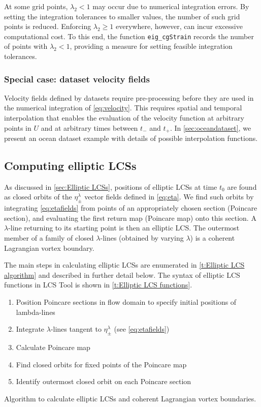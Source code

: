 \documentclass{elsarticle}
\begin{document}
At some grid points, $\lambda_2 < 1$ may occur due to numerical integration errors. By setting the integration tolerances to smaller values, the number of such grid points is reduced. Enforcing $\lambda_2 \geq 1$ everywhere, however, can incur excessive computational cost. To this end, the function \lstinline!eig_cgStrain! records the number of points with $\lambda_2 < 1$, providing a measure for setting feasible integration tolerances.

\subsubsection{Special case: dataset velocity fields}

Velocity fields defined by datasets require pre-processing before they are used in the numerical integration of \cref{eq:velocity}. This requires spatial and temporal interpolation that enables the evaluation of the velocity function at arbitrary points in $U$ and at arbitrary times between $t_-$ and $t_+$. In \cref{sec:oceandataset}, we present an ocean dataset example with details of possible interpolation functions.

\subsection{Computing elliptic LCSs}

As discussed in \cref{sec:Elliptic LCSs}, positions of elliptic LCSs at time $t_0$ are found as closed orbits of the $\eta_\pm^\lambda$ vector fields defined in \cref{eq:eta}. We find such orbits by integrating \cref{eq:etafields} from points of an appropriately chosen section (Poincare section), and evaluating the first return map (Poincare map) onto this section. A $\lambda$-line returning to its starting point is then an elliptic LCS. The outermost member of a family of closed $\lambda$-lines (obtained by varying $\lambda$) is a coherent Lagrangian vortex boundary\citep{haller13:_coher_lagran}.

The main steps in calculating elliptic LCSs are enumerated in \cref{t:Elliptic LCS algorithm} and described in further detail below. The syntax of elliptic LCS functions in LCS Tool is shown in \cref{t:Elliptic LCS functions}.

\begin{table}
\begin{center}
\begin{enumerate}
\item Position Poincare sections in flow domain to specify initial positions of lambda-lines
\item Integrate $\lambda$-lines tangent to $\eta_\pm^\lambda$ (see \cref{eq:etafields})
\item Calculate Poincare map
\item Find closed orbits for fixed points of the Poincare map
\item Identify outermost closed orbit on each Poincare section
\end{enumerate}
\end{center}
\caption{Algorithm to calculate elliptic LCSs and coherent Lagrangian vortex boundaries.}
\label{t:Elliptic LCS algorithm}
\end{table}
\end{document}
